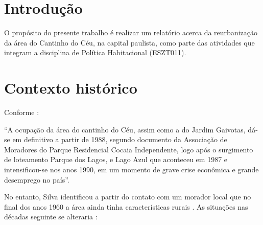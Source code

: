 	
	
	\tableofcontents 
	\newpage \listoffigures
	\newpage \listoftables
	\textual
	
	
	
	
	\chapter{Introdução}
	
	O propósito do presente trabalho é realizar um relatório acerca da reurbanização da área do Cantinho do Céu, na capital paulista, como parte das atividades que integram a disciplina de Política Habitacional (ESZT011).
	
	\chapter{Contexto histórico}
	
	Conforme :
	
	\begin{citacao}
		``A ocupação da área do cantinho do Céu, assim como a do Jardim Gaivotas, dá-se em definitivo a partir de 1988, segundo documento da Associação de Moradores do Parque Residencial Cocaia Independente, logo após o surgimento de loteamento Parque dos Lagos, e Lago Azul que aconteceu em 1987 e intensificou-se nos anos 1990, em um momento de grave crise econômica e grande desemprego no país''.
	\end{citacao}
	
	No entanto, Silva identificou a partir do contato com um morador local que no final dos anos 1960 a área ainda tinha características rurais \cite[p.80]{Silva2016}. As situações nas décadas seguinte se alteraria \cite[p.82]{Silva2016}:
	
